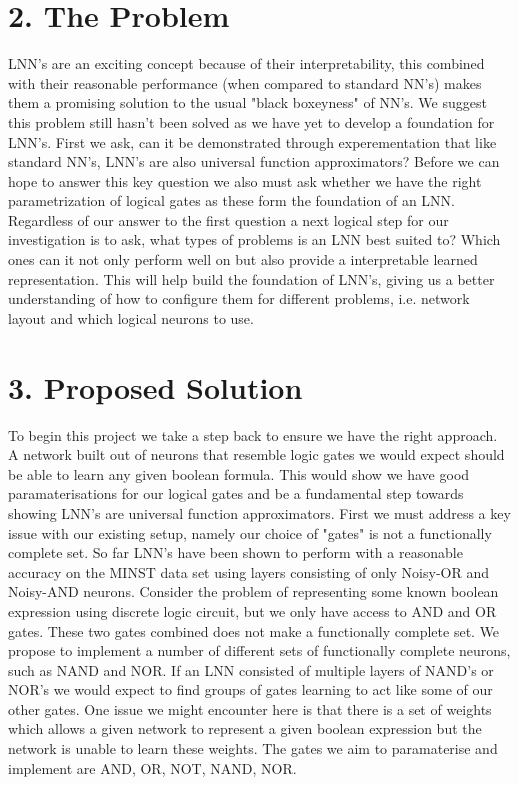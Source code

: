\documentclass[11pt, a4paper, twoside, openright]{report}
\begin{document}
\section*{2. The Problem}

LNN's are an exciting concept because of their interpretability, this combined with their reasonable performance (when compared to standard NN's) makes them a promising solution to the usual "black boxeyness" of NN's. We suggest this problem still hasn't been solved as we have yet to develop a foundation for LNN's. First we ask, can it be demonstrated through experementation that like standard NN's, LNN's are also universal function approximators?  Before we can hope to answer this key question we also must ask whether we have the right parametrization of logical gates as these form the foundation of an LNN. \\

Regardless of our answer to the first question a next logical step for our investigation is to ask, what types of problems is an LNN best suited to? Which ones can it not only perform well on but also provide a interpretable learned representation. This will help build the foundation of LNN's, giving us a better understanding of how to configure them for different problems, i.e. network layout and which logical neurons to use.\\

\section*{3. Proposed Solution}

To begin this project we take a step back to ensure we have the right approach. A network built out of neurons that resemble logic gates we would expect should be able to learn any given boolean formula. This would show we have good paramaterisations for our logical gates and be a fundamental step towards showing LNN's are universal function approximators. First we must address a key issue with our existing setup, namely our choice of "gates" is not a functionally complete set. So far LNN's have been shown to perform with a reasonable accuracy on the MINST data set using layers consisting of only Noisy-OR and Noisy-AND neurons. Consider the problem of representing some known boolean expression using discrete logic circuit, but we only have access to AND and OR gates. These two gates combined does not make a functionally complete set. We propose to implement a number of different sets of functionally complete neurons, such as NAND and NOR. If an LNN consisted of multiple layers of NAND's or NOR's we would expect to find groups of gates learning to act like some of our other gates. One issue we might encounter here is that there is a set of weights which allows a given network to represent a given boolean expression but the network is unable to learn these weights. The gates we aim to paramaterise and implement are AND, OR, NOT, NAND, NOR. \\
\end{document}
